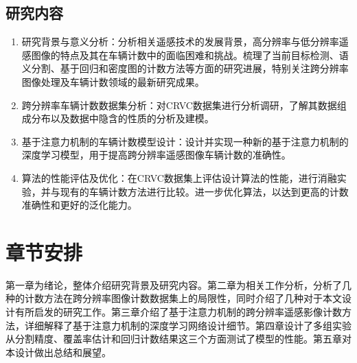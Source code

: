 \subsection{研究内容}
\begin{enumerate}
    \item 研究背景与意义分析：分析相关遥感技术的发展背景，高分辨率与低分辨率遥感图像的特点及其在车辆计数中的面临困难和挑战。梳理了当前目标检测、语义分割、基于回归和密度图的计数方法等方面的研究进展，特别关注跨分辨率图像处理及车辆计数领域的最新研究成果。
    \item 跨分辨率车辆计数数据集分析：对CRVC数据集进行分析调研，了解其数据组成分布以及数据中隐含的性质的分析及建模。
    \item 基于注意力机制的车辆计数模型设计：设计并实现一种新的基于注意力机制的深度学习模型，用于提高跨分辨率遥感图像车辆计数的准确性。
    \item 算法的性能评估及优化：在CRVC数据集上评估设计算法的性能，进行消融实验，并与现有的车辆计数方法进行比较。进一步优化算法，以达到更高的计数准确性和更好的泛化能力。
\end{enumerate}

\section{章节安排}
第一章为绪论，整体介绍研究背景及研究内容。第二章为相关工作分析，分析了几种的计数方法在跨分辨率图像计数数据集上的局限性，同时介绍了几种对于本文设计有所启发的研究工作。第三章介绍了基于注意力机制的跨分辨率遥感影像计数方法，详细解释了基于注意力机制的深度学习网络设计细节。第四章设计了多组实验从分割精度、覆盖率估计和回归计数结果这三个方面测试了模型的性能。第五章对本设计做出总结和展望。
